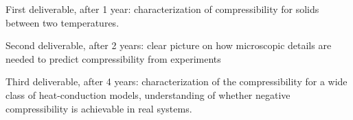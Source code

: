 \begin{workpackage}[id=WPcompress,wphases=0-48,
  short=Nonequilibrium compressibility, %
  title=Nonequilibrium compressibility, %
  lead=UNIPD,
  UNIPDRM=48]
\begin{wpdelivs}
  \begin{wpdeliv}[due=18,id=mydeliv1,dissem=PU,nature=DEM,lead=UNIPD]
      {First deliverable, after 1 year: characterization of compressibility for solids between two temperatures.}
  \end{wpdeliv}
  \begin{wpdeliv}[due=24,id=mydeliv2,dissem=PU,nature=DEM,lead=UNIPD]
      {Second deliverable, after 2 years: clear picture on how microscopic details are needed to predict compressibility from experiments}
  \end{wpdeliv}
  \begin{wpdeliv}[due=48,id=mydeliv3,dissem=PU,nature=DEM,lead=UNIPD]
      {Third deliverable, after 4 years: characterization of the compressibility for a wide class of heat-conduction models, understanding of whether negative compressibility is achievable in real systems.}
\end{wpdeliv}
\end{wpdelivs}




\end{workpackage}
